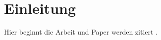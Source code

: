 
\newpage

\chapter{Einleitung} %
\label{cha:einleitung}

Hier beginnt die Arbeit und Paper werden zitiert \cite{baumgaertner2015misuse}.